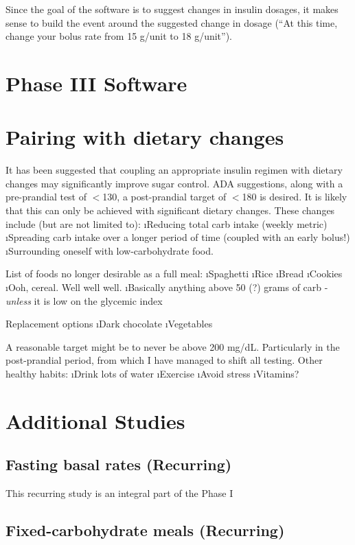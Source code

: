 Since the goal of the software is to suggest changes in insulin dosages, it makes sense to build the 
event around the suggested change in dosage (``At this time, change your bolus rate from 15 g/unit 
to 18 g/unit''). 

\section{Phase III Software}

\section{Pairing with dietary changes}
It has been suggested that coupling an appropriate insulin regimen with dietary changes may 
significantly improve sugar control. ADA suggestions, along with a pre-prandial test of $<$130, 
a post-prandial target of $<$180 is desired. It is likely that this can only be achieved with 
significant dietary changes. These changes include (but are not limited to):
\bi
	\i Reducing total carb intake (weekly metric)
	\i Spreading carb intake over a longer period of time (coupled with an early bolus!)
	\i Surrounding oneself with low-carbohydrate food.
\ei

List of foods no longer desirable as a full meal:
\bi
	\i Spaghetti
	\i Rice
	\i Bread
	\i Cookies
	\i Ooh, cereal. Well well well.
	\i Basically anything above 50 (?) grams of carb - {\it unless} it is low on the glycemic index
\ei

Replacement options
\bi
	\i Dark chocolate
	\i Vegetables
\ei

A reasonable target might be to never be above 200 mg/dL. Particularly in the post-prandial period, 
from which I have managed to shift all testing. Other healthy habits:
\bi
	\i Drink lots of water
	\i Exercise
	\i Avoid stress
	\i Vitamins?
\ei


\section{Additional Studies}

\subsection{Fasting basal rates (Recurring)}

This recurring study is an integral part of the Phase I 

\subsection{Fixed-carbohydrate meals (Recurring)}

